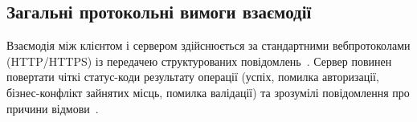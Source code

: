 \subsection{Загальні протокольні вимоги взаємодії}\label{sec:interfeisy-protokoly}
Взаємодія між клієнтом і сервером здійснюється за стандартними вебпротоколами (HTTP/HTTPS) із передачею структурованих повідомлень~. Сервер повинен повертати чіткі статус-коди результату операції (успіх, помилка авторизації, бізнес-конфлікт зайнятих місць, помилка валідації) та зрозумілі повідомлення про причини відмови~.
